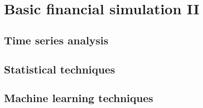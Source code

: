 \chapter{Basic financial simulation II}
\section{Time series analysis}



\section{Statistical techniques}



\section{Machine learning techniques}


